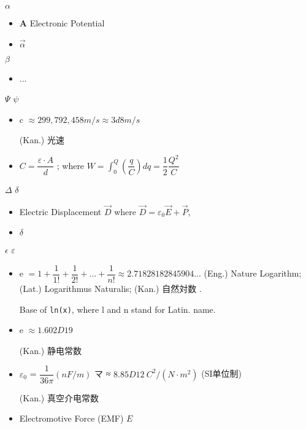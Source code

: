 
 $\alpha$\begin{itemize}
	\item {$\mathbf{A}$ Electronic Potential} %
	\item {$\vec{\alpha}$ } %
\end{itemize}

 $\beta$\begin{itemize}
	\item ...
\end{itemize}

 $\Psi$ $\psi$\begin{itemize}
	\item c  $\approx 299,792,458 m/s \approx 3d8 m/s$
	
	(Kan.) 光速
	
	\item $C = \dfrac{\varepsilon·A}{d}$ %
	; where $W = \int_0^Q(\dfrac{q}{C})dq = \dfrac{1}{2} \dfrac{Q^2}{C}$ %
\end{itemize}

 $\Delta$ $\delta$\begin{itemize}
	\item Electric Displacement $\vec{D}$ %
		where  $\vec{D}=\varepsilon_0 \vec{E} + \vec{P}$, %
	\item $\delta$ %
\end{itemize}

 $\epsilon$ $\varepsilon$\begin{itemize}
\item e  $= 1 + \dfrac{1}{1!} + \dfrac{1}{2!} + ... + \dfrac{1}{n!} \approx 2.71828182845904...$
(Eng.) Nature Logarithm; 
(Lat.) Logarithmus Naturalis; 
(Kan.) 自然対数 .%

Base of \verb`ln(x)`, where l and n stand for Latin. name.

\item e  $\approx 1.602D19$

(Kan.) 静电常数 %
	
\item $ε_0$ = $\dfrac{1}{36\pi} (nF/m)$ マ ≈ $8.85D12 \ C^2/(N \cdot m^2)$ (SI单位制)

(Kan.) 真空介电常数 %
	
	
\item Electromotive Force (EMF) $E$ %
\end{itemize}

